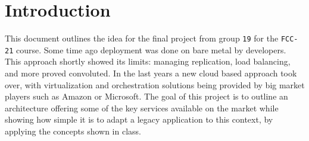\section{Introduction}
\label{cha:intro}
This document outlines the idea for the final project from group \verb=19= for the \verb=FCC-21= course.
\newline
Some time ago deployment was done on bare metal by developers. This approach shortly showed its limits: managing replication, load balancing, and more proved convoluted. In the last years a new cloud based approach took over, with virtualization and orchestration solutions being provided by big market players such as Amazon or Microsoft. 
\newline
The goal of this project is to outline an architecture offering some of the key services available on the market while showing how simple it is to adapt a legacy application to this context, by applying the concepts shown in class.